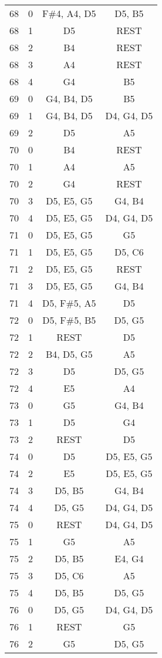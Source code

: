 \documentclass{article}
\begin{document}
\begin{longtable}{|c|c|c|c|}
\hline
68 & 0 & F\#4, A4, D5 & D5, B5 \\ 
68 & 1 & D5 & REST \\ 
68 & 2 & B4 & REST \\ 
68 & 3 & A4 & REST \\ 
68 & 4 & G4 & B5 \\ 
\hline
69 & 0 & G4, B4, D5 & B5 \\ 
69 & 1 & G4, B4, D5 & D4, G4, D5 \\ 
69 & 2 & D5 & A5 \\ 
\hline
70 & 0 & B4 & REST \\ 
70 & 1 & A4 & A5 \\ 
70 & 2 & G4 & REST \\ 
70 & 3 & D5, E5, G5 & G4, B4 \\ 
70 & 4 & D5, E5, G5 & D4, G4, D5 \\ 
\hline
71 & 0 & D5, E5, G5 & G5 \\ 
71 & 1 & D5, E5, G5 & D5, C6 \\ 
71 & 2 & D5, E5, G5 & REST \\ 
71 & 3 & D5, E5, G5 & G4, B4 \\ 
71 & 4 & D5, F\#5, A5 & D5 \\ 
\hline
72 & 0 & D5, F\#5, B5 & D5, G5 \\ 
72 & 1 & REST & D5 \\ 
72 & 2 & B4, D5, G5 & A5 \\ 
72 & 3 & D5 & D5, G5 \\ 
72 & 4 & E5 & A4 \\ 
\hline
73 & 0 & G5 & G4, B4 \\ 
73 & 1 & D5 & G4 \\ 
73 & 2 & REST & D5 \\ 
\hline
74 & 0 & D5 & D5, E5, G5 \\ 
74 & 2 & E5 & D5, E5, G5 \\ 
74 & 3 & D5, B5 & G4, B4 \\ 
74 & 4 & D5, G5 & D4, G4, D5 \\ 
\hline
75 & 0 & REST & D4, G4, D5 \\ 
75 & 1 & G5 & A5 \\ 
75 & 2 & D5, B5 & E4, G4 \\ 
75 & 3 & D5, C6 & A5 \\ 
75 & 4 & D5, B5 & D5, G5 \\ 
\hline
76 & 0 & D5, G5 & D4, G4, D5 \\ 
76 & 1 & REST & G5 \\ 
76 & 2 & G5 & D5, G5 \\ 

\end{longtable}
\end{document}
